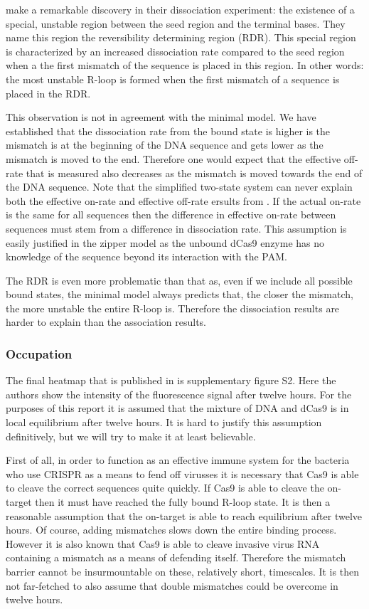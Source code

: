 \cite{PNAS} make a remarkable discovery in their dissociation experiment: the existence of a special, unstable region between the seed region and the terminal bases. They name this region the reversibility determining region (RDR). This special region is characterized by an increased dissociation rate compared to the seed region when a the first mismatch of the sequence is placed in this region. In other words: the most unstable R-loop is formed when the first mismatch of a sequence is placed in the RDR.

This observation is not in agreement with the minimal model. We have established that the dissociation rate from the bound state is higher is the mismatch is at the beginning of the DNA sequence and gets lower as the mismatch is moved to the end. Therefore one would expect that the effective off-rate that is measured also decreases as the mismatch is moved towards the end of the DNA sequence. Note that the simplified two-state system can never explain both the effective on-rate and effective off-rate ersults from \cite{PNAS}. If the actual on-rate is the same for all sequences then the difference in effective on-rate between sequences must stem from a difference in dissociation rate. This assumption is easily justified in the zipper model as the unbound dCas9 enzyme has no knowledge of the sequence beyond its interaction with the PAM.

The RDR is even more problematic than that as, even if we include all possible bound states, the minimal model always predicts that, the closer the mismatch, the more unstable the entire R-loop is. Therefore the dissociation results are harder to explain than the association results.


\subsubsection{Occupation}

The final heatmap that is published in \cite{PNAS} is supplementary figure S2.
Here the authors show the intensity of the fluorescence signal after twelve hours. For the purposes of this report it is assumed that the mixture of DNA and dCas9 is in local equilibrium after twelve hours. It is hard to justify this assumption definitively, but we will try to make it at least believable.

First of all, in order to function as an effective immune system for the bacteria who use CRISPR as a means to fend off virusses it is necessary that Cas9 is able to cleave the correct sequences quite quickly. If Cas9 is able to cleave the on-target then it must have reached the fully bound R-loop state. It is then a reasonable assumption that the on-target is able to reach equilibrium after twelve hours. Of course, adding mismatches slows down the entire binding process. However it is also known that Cas9 is able to cleave invasive virus RNA containing a mismatch as a means of defending itself. Therefore the mismatch barrier cannot be insurmountable on these, relatively short, timescales. It is then not far-fetched to also assume that double mismatches could be overcome in twelve hours. %

